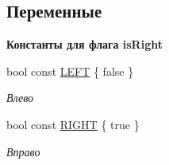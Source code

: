 \subsection*{Переменные}
\begin{Indent}\textbf{ Константы для флага is\+Right}\par
\begin{DoxyCompactItemize}
\item 
\mbox{\label{namespacertm_a92d29773a54951290dd89f754fb39a8c}} 
bool const \hyperlink{namespacertm_a92d29773a54951290dd89f754fb39a8c}{L\+E\+FT} \{ false \}
\begin{DoxyCompactList}\small\item\em Влево \end{DoxyCompactList}\item 
\mbox{\label{namespacertm_a18eb7493925a15e12096e1a6170c3da7}} 
bool const \hyperlink{namespacertm_a18eb7493925a15e12096e1a6170c3da7}{R\+I\+G\+HT} \{ true \}
\begin{DoxyCompactList}\small\item\em Вправо \end{DoxyCompactList}\end{DoxyCompactItemize}
\end{Indent}
